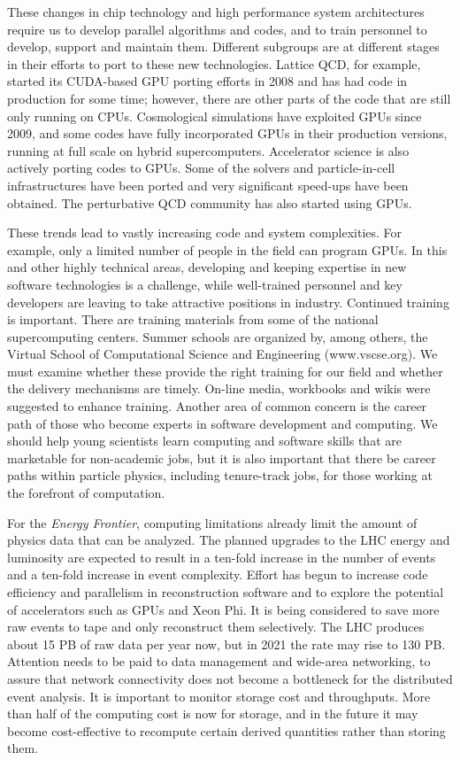 These changes in chip technology and high performance system architectures
require us to develop parallel algorithms and codes, and to train personnel
to develop, support and maintain them. Different subgroups are at different
stages in their efforts to port to these new technologies. Lattice QCD, for
example, started its CUDA-based GPU porting efforts in 2008 and has had code in
production for some time; however, there
are other parts of the code that are still only running on CPUs.
Cosmological simulations have exploited GPUs since 2009, and some 
codes have fully incorporated GPUs in their production versions, running 
at full scale on hybrid supercomputers.
Accelerator science is also actively porting codes to GPUs. Some of the
solvers and particle-in-cell infrastructures have been ported and very
significant speed-ups have been obtained. The perturbative QCD community
has also started using GPUs.

These trends lead to vastly increasing code and system complexities. For
example, only a limited number of people in the field can program GPUs. In
this and other highly technical areas, developing and keeping expertise in
new software technologies is a challenge, while well-trained personnel and
key developers are leaving to take attractive positions in industry.
Continued training is important.  There are training materials
from some of the national supercomputing centers.  Summer schools are
organized by, among others, the Virtual School of Computational Science and
Engineering (www.vscse.org). We must examine whether these provide the
right training for our field and whether the delivery mechanisms are
timely.  On-line media, workbooks and wikis were suggested to enhance
training. Another area of common concern is the career path of those who
become experts in software development and computing. We should help
young scientists learn computing and software skills that are marketable
for non-academic jobs, but it is also important that there be career paths
within particle physics, including tenure-track jobs, for those working at
the forefront of computation.

For the {\it Energy Frontier}, computing limitations already
limit the amount of physics data that can be analyzed. The
planned upgrades to the LHC energy and luminosity are expected to result in
a ten-fold increase in the number of events and a ten-fold increase in
event complexity. Effort has begun to increase code efficiency and
parallelism in reconstruction software and to explore the potential of
accelerators such as GPUs and Xeon Phi. It is being considered to save more raw events to tape and only
reconstruct them selectively. The LHC produces about 15 PB of raw data per
year now, but in 2021 the rate may rise to 130 PB. Attention needs to be
paid to data management and wide-area networking, to assure that network
connectivity does not become a bottleneck for the distributed event
analysis. It is important to monitor storage cost and throughputs. More
than half of the computing cost is now for storage, and in the future it
may become cost-effective to recompute certain derived quantities rather
than storing them.

